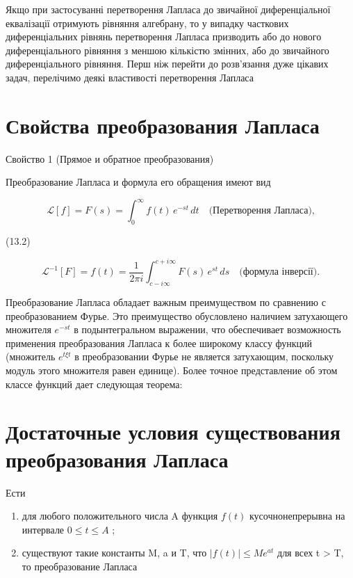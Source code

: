 \documentclass[
  ukrainian,
]{article}
\begin{document}
Якщо при застосуванні перетворення Лапласа до звичайної диференціальної
еквалізації отримують рівняння алгебрану, то у випадку часткових
диференціальних рівнянь перетворення Лапласа призводить або до нового
диференціального рівняння з меншою кількістю змінних, або до звичайного
диференціального рівняння. Перш ніж перейти до розв'язання дуже цікавих
задач, перелічимо деякі властивості перетворення Лапласа

\section{Свойства преобразования
Лапласа}\label{ux441ux432ux43eux439ux441ux442ux432ux430-ux43fux440ux435ux43eux431ux440ux430ux437ux43eux432ux430ux43dux438ux44f-ux43bux430ux43fux43bux430ux441ux430}

Свойство 1 (Прямое и обратное преобразования)

Преобразование Лапласа и формула его обращения имеют вид

\[
\mathscr{L}[f] = F(s) = \int_{0}^{\infty} f(t) \, e^{-st} \, dt \quad \text{(Перетворення Лапласа),}
\]

(13.2)

\[
\mathscr{L}^{-1}[F] = f(t) = \frac{1}{2\pi i} \int_{c-i\infty}^{c+i\infty} F(s) \, e^{st} \, ds \quad \text{(формула інверсії).}
\]

Преобразование Лапласа обладает важным преимуществом по сравнению с
преобразованием Фурье. Это преимущество обусловлено наличием затухающего
множителя \(e^{-st}\) в подынтегральном выражении, что обеспечивает
возможность применения преобразования Лапласа к более широкому классу
функций (множитель \(e^{t\xi t}\) в преобразовании Фурье не является
затухающим, поскольку модуль этого множителя равен единице). Более
точное представление об этом классе функций дает следующая теорема:

\section{Достаточные условия существования преобразования
Лапласа}\label{ux434ux43eux441ux442ux430ux442ux43eux447ux43dux44bux435-ux443ux441ux43bux43eux432ux438ux44f-ux441ux443ux449ux435ux441ux442ux432ux43eux432ux430ux43dux438ux44f-ux43fux440ux435ux43eux431ux440ux430ux437ux43eux432ux430ux43dux438ux44f-ux43bux430ux43fux43bux430ux441ux430}

Ести

\begin{enumerate}
\def\labelenumi{\arabic{enumi})}
\item
  для любого положительного числа A функция \(f(t)\) кусочнонепрерывна
  на интервале \(0 \le t \le A\) ;
\item
  существуют такие константы M, a и T, что \(|f(t)| \leq Me^{at}\) для
  всех t \textgreater{} T, то преобразование Лапласа
\end{enumerate}
\end{document}
